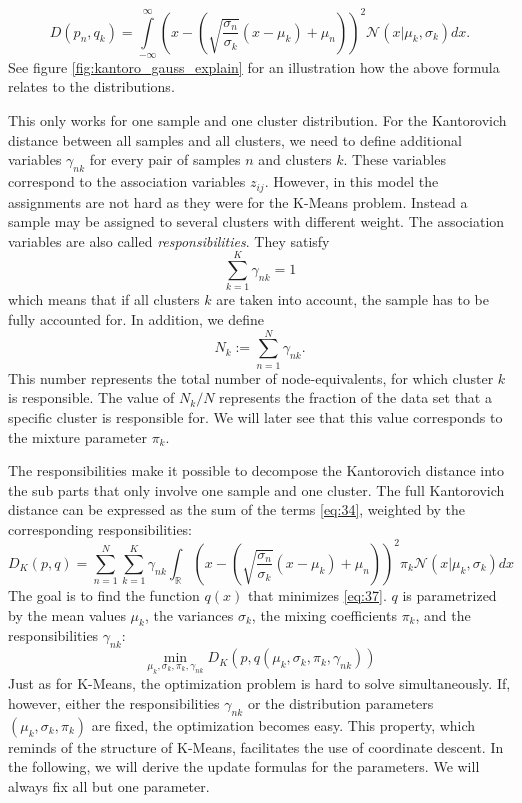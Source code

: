 \begin{equation}
  \label{eq:34}
  D(p_n,q_k) = \int\limits_{-\infty}^{\infty}\left(x-\left(\sqrt{\frac{\sigma_n}{\sigma_k}}(x-\mu_k)+\mu_n\right)\right)^2\mathcal{N}(x|\mu_k,\sigma_k)dx.
\end{equation}
See figure \ref{fig:kantoro_gauss_explain} for an illustration how the above formula relates to the distributions.

This only works for one sample and one cluster distribution.
For the Kantorovich distance between all samples and all clusters, we need to define additional variables $\gamma_{nk}$ for every pair of samples $n$ and clusters $k$.
These variables correspond to the association variables $z_{ij}$.
However, in this model the assignments are not hard as they were for the K-Means problem.
Instead a sample may be assigned to several clusters with different weight.
The association variables are also called \textit{responsibilities}.
They satisfy
\begin{equation}
  \label{eq:35}
  \sum_{k=1}^K\gamma_{nk} = 1
\end{equation}
which means that if all clusters $k$ are taken into account, the sample has to be fully accounted for.
In addition, we define
\begin{equation}
  \label{eq:36}
  N_k := \sum_{n=1}^N \gamma_{nk}.
\end{equation}
This number represents the total number of node-equivalents, for which cluster $k$ is responsible.
The value of $N_k/N$ represents the fraction of the data set that a specific cluster is responsible for.
We will later see that this value corresponds to the mixture parameter $\pi_k$.

The responsibilities make it possible to decompose the Kantorovich distance into the sub parts that only involve one sample and one cluster.
The full Kantorovich distance can be expressed as the sum of the terms \eqref{eq:34}, weighted by the corresponding responsibilities:
\begin{equation}
  \label{eq:37}
  D_K(p,q) = \sum_{n=1}^N\sum_{k=1}^K\gamma_{nk}\int_\mathbb{R}\left(x-\left(\sqrt{\frac{\sigma_n}{\sigma_k}}(x-\mu_k)+\mu_n\right)\right)^2\pi_k\mathcal{N}(x|\mu_k,\sigma_k)dx
\end{equation}
The goal is to find the function $q(x)$ that minimizes \eqref{eq:37}.
$q$ is parametrized by the mean values $\mu_k$, the variances $\sigma_k$, the mixing coefficients $\pi_k$, and the responsibilities $\gamma_{nk}$:
\begin{equation}
  \label{eq:38}
  \min\limits_{\mu_k,\sigma_k,\pi_k, \gamma_{nk}}D_K(p,q(\mu_k,\sigma_k,\pi_k, \gamma_{nk}))
\end{equation}
Just as for K-Means, the optimization problem is hard to solve simultaneously.
If, however, either the responsibilities $\gamma_{nk}$ or the distribution parameters $(\mu_k, \sigma_k, \pi_k)$ are fixed, the optimization becomes easy.
This property, which reminds of the structure of K-Means, facilitates the use of coordinate descent.
In the following, we will derive the update formulas for the parameters.
We will always fix all but one parameter.

